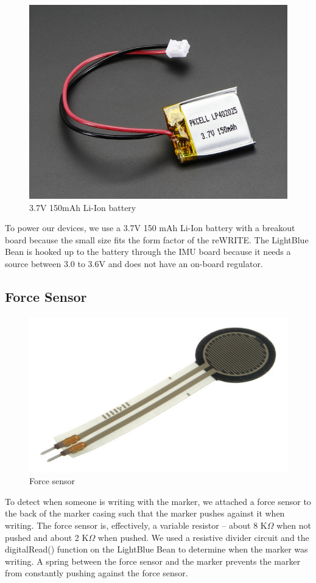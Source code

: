 \documentclass[10pt,journal]{IEEEtran}
\begin{document}
\begin{figure}[H]
    \includegraphics[width=0.6\linewidth]{figures/battery}
  \caption{3.7V 150mAh Li-Ion battery}
  \label{fig:battery}
\end{figure}
  To power our devices, we use a 3.7V 150 mAh Li-Ion battery with a breakout board because the small size fits the form factor of the reWRITE. The LightBlue Bean is hooked up to the battery through the IMU board because it needs a source between 3.0 to 3.6V and does not have an on-board regulator.

\subsection{Force Sensor}

\begin{figure}[H]
    \includegraphics[width=0.6\linewidth]{figures/force-sensor}
  \caption{Force sensor}
  \label{fig:system}
\end{figure}
  To detect when someone is writing with the marker, we attached a force sensor to the back of the marker casing such that the marker pushes against it when writing. The force sensor is, effectively, a variable resistor -- about 8 K$\Omega$ when not pushed and about 2 K$\Omega$ when pushed. We used a resistive divider circuit and the digitalRead() function on the LightBlue Bean to determine when the marker was writing. A spring between the force sensor and the marker prevents the marker from constantly pushing against the force sensor.
\end{document}
